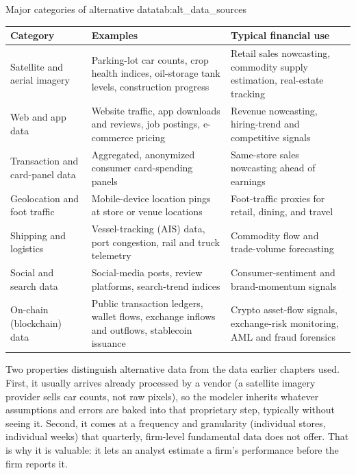 \documentclass[../ai_in_finance]{subfiles}
\begin{document}
\begin{booktable}[htbp]{Major categories of alternative data}{tab:alt_data_sources}
\begin{tabular}{L{2.6cm}L{6.2cm}L{5.4cm}}
\toprule
Category & Examples & Typical financial use \\
\midrule
Satellite and aerial imagery & Parking-lot car counts, crop health indices, oil-storage tank levels, construction progress & Retail sales nowcasting, commodity supply estimation, real-estate tracking \\
Web and app data & Website traffic, app downloads and reviews, job postings, e-commerce pricing & Revenue nowcasting, hiring-trend and competitive signals \\
Transaction and card-panel data & Aggregated, anonymized consumer card-spending panels & Same-store sales nowcasting ahead of earnings \\
Geolocation and foot traffic & Mobile-device location pings at store or venue locations & Foot-traffic proxies for retail, dining, and travel \\
Shipping and logistics & Vessel-tracking (AIS) data, port congestion, rail and truck telemetry & Commodity flow and trade-volume forecasting \\
Social and search data & Social-media posts, review platforms, search-trend indices & Consumer-sentiment and brand-momentum signals \\
On-chain (blockchain) data & Public transaction ledgers, wallet flows, exchange inflows and outflows, stablecoin issuance & Crypto asset-flow signals, exchange-risk monitoring, AML and fraud forensics \\
\bottomrule
\end{tabular}
\end{booktable}

Two properties distinguish alternative data from the data earlier chapters used. First, it usually arrives already processed by a vendor (a satellite imagery provider sells car counts, not raw pixels), so the modeler inherits whatever assumptions and errors are baked into that proprietary step, typically without seeing it. Second, it comes at a frequency and granularity (individual stores, individual weeks) that quarterly, firm-level fundamental data does not offer. That is why it is valuable: it lets an analyst estimate a firm's performance before the firm reports it.
\end{document}
